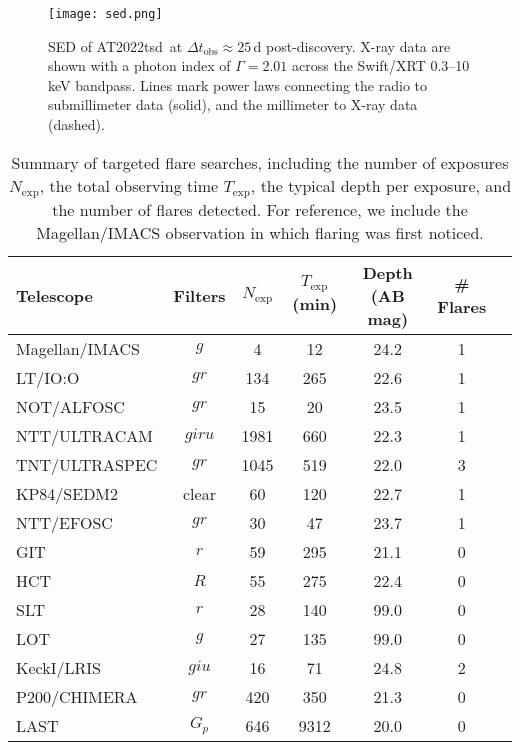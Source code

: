 \documentclass{nature_plusfigure}
\newcommand{\at}{AT2022tsd}
\begin{document}
\begin{extended_data}
\begin{figure}[!ht]
 \centering
\texttt{[image: sed.png]}
  \caption{SED of \at\ at $\Delta t_\mathrm{obs}\approx25\,$d post-discovery. X-ray data are shown with a photon index of $\Gamma=2.01$ across the Swift/XRT 0.3--10\,keV bandpass. Lines mark power laws connecting the radio to submillimeter data (solid), and the millimeter to X-ray data (dashed).}
 \label{fig:full-sed}
\end{figure}

\begin{table}
\begin{center}
\caption{Summary of targeted flare searches, including the number of exposures $N_\mathrm{exp}$, the total observing time $T_\mathrm{exp}$, the typical depth per exposure, and the number of flares detected. For reference, we include the Magellan/IMACS observation in which flaring was first noticed.}
\label{tab:flare-searches}
\begin{tabular}{lcccccc} 
\hline\hline
Telescope & Filters & $N_\mathrm{exp}$ & $T_\mathrm{exp}$ (min) & Depth (AB mag) & \# Flares \\
\hline
Magellan/IMACS & $g$ & 4 & 12 & 24.2 & 1 \\
LT/IO:O & $gr$ & 134 & 265 & 22.6 & 1 \\
NOT/ALFOSC & $gr$ & 15 & 20 & 23.5 & 1 \\
NTT/ULTRACAM & $giru$ & 1981 & 660 & 22.3 & 1 \\
TNT/ULTRASPEC & $gr$ & 1045 & 519 & 22.0 & 3 \\
KP84/SEDM2 & clear & 60 & 120 & 22.7 & 1 \\
NTT/EFOSC & $gr$ & 30 & 47 & 23.7 & 1 \\
GIT & $r$ & 59 & 295 & 21.1 & 0 \\
HCT & $R$ & 55 & 275 & 22.4 & 0 \\
SLT & $r$ & 28 & 140 & 99.0 & 0 \\
LOT & $g$ & 27 & 135 & 99.0 & 0 \\
KeckI/LRIS & $giu$ & 16 & 71 & 24.8 & 2 \\
P200/CHIMERA & $gr$ & 420 & 350 & 21.3 & 0 \\
LAST & $G_p$ & 646 & 9312 & 20.0 & 0 \\
\hline
\end{tabular}
\end{center}
\end{table}


\end{extended_data}
\end{document}
